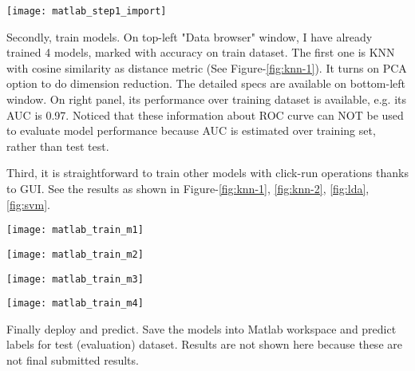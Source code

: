 \begin{marginfigure}
	\texttt{[image: matlab\_step1\_import]}
	\caption{Importing data from Matlab workspace with statistic and machine learning toolbox. }
	\label{fig:matlab-import}
\end{marginfigure}

Secondly, train models. On top-left "Data browser" window, I have already trained 4 models, marked with accuracy on train dataset. The first one is KNN with cosine similarity as distance metric (See Figure-\ref{fig:knn-1}). It turns on PCA option to do dimension reduction. The detailed specs are available on bottom-left window. On right panel, its performance over training dataset is available, e.g. its AUC is 0.97. Noticed that these information about ROC curve can NOT be used to evaluate model performance because AUC is estimated over training set, rather than test test. 

Third, it is straightforward to train other models with click-run operations thanks to GUI. See the results as shown in Figure-\ref{fig:knn-1}, \ref{fig:knn-2}, \ref{fig:lda}, \ref{fig:svm}. 

\begin{figure*}[ht]
	\texttt{[image: matlab\_train\_m1]}
	\caption{First KNN model details. Distance metric: cosine similarity; PCA: enabled. }
	\label{fig:knn-1}
\end{figure*}

\begin{figure*}[ht]
	\texttt{[image: matlab\_train\_m2]}
	\caption{Second KNN model details.Distance metric: cosine similarity; PCA: disabled. }
	\label{fig:knn-2}
\end{figure*}

\begin{figure*}[ht]
	\texttt{[image: matlab\_train\_m3]}
	\caption{Third model: LDA. }
	\label{fig:lda}
\end{figure*}

\begin{figure*}[ht]
	\texttt{[image: matlab\_train\_m4]}
	\caption{Fourth model: SVM (Gaussian kernel). }
	\label{fig:svm}
\end{figure*}

Finally deploy and predict. Save the models into Matlab workspace and predict labels for test (evaluation) dataset. Results are not shown here because these are not final submitted results. 




